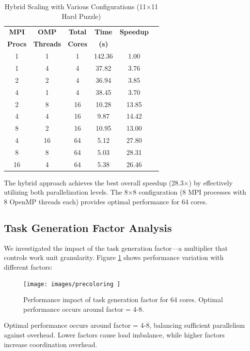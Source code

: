 \begin{table}[htbp]
\caption{Hybrid Scaling with Various Configurations (11×11 Hard Puzzle)}
\begin{center}
\begin{tabular}{@{}cccccc@{}}
\toprule
\textbf{MPI} & \textbf{OMP} & \textbf{Total} & \textbf{Time} & \textbf{Speedup} \\
\textbf{Procs} & \textbf{Threads} & \textbf{Cores} & \textbf{(s)} & \\
\midrule
1 & 1 & 1 & 142.36 & 1.00 \\
1 & 4 & 4 & 37.82 & 3.76 \\
2 & 2 & 4 & 36.94 & 3.85 \\
4 & 1 & 4 & 38.45 & 3.70 \\
2 & 8 & 16 & 10.28 & 13.85 \\
4 & 4 & 16 & 9.87 & 14.42 \\
8 & 2 & 16 & 10.95 & 13.00 \\
4 & 16 & 64 & 5.12 & 27.80 \\
8 & 8 & 64 & 5.03 & 28.31 \\
16 & 4 & 64 & 5.38 & 26.46 \\
\bottomrule
\end{tabular}
\end{center}
\label{tab:hybrid_scaling}
\end{table}

The hybrid approach achieves the best overall speedup (28.3×) by effectively utilizing both parallelization levels. The 8×8 configuration (8 MPI processes with 8 OpenMP threads each) provides optimal performance for 64 cores.

\subsection{Task Generation Factor Analysis}
We investigated the impact of the task generation factor—a multiplier that controls work unit granularity. Figure \ref{fig:task_factor} shows performance variation with different factors:

\begin{figure}[htbp]
\centering
\texttt{[image: images/precoloring ]}
\caption{Performance impact of task generation factor for 64 cores. Optimal performance occurs around factor = 4-8.}
\label{fig:task_factor}
\end{figure}

Optimal performance occurs around factor = 4-8, balancing sufficient parallelism against overhead. Lower factors cause load imbalance, while higher factors increase coordination overhead.

